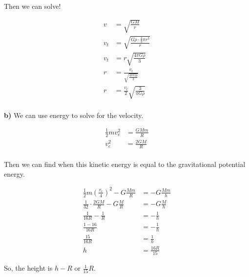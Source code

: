 \documentclass{article}
\begin{document}
Then we can solve!

\begin{align*}
    v &= \sqrt{\frac{GM}{r}} \\
    v_t &= \sqrt{\frac{G\rho\cdot\frac{4}{3}\pi r^3}{r}} \\
    v_t &= r \sqrt{\frac{4\pi G\rho}{3}} \\
    r &= \frac{v_t}{\sqrt{\frac{4\pi G\rho}{3}}} \\
    r &= \frac{v_t}{2}\sqrt{\frac{3}{\pi G\rho}} \\
\end{align*}

\vspace{1cm}
\textbf{b)} We can use energy to solve for the velocity.

\begin{align*}
    \frac{1}{2}mv_e^2 &= \frac{GMm}{R} \\
    v_e^2 &= \frac{2GM}{R} \\
\end{align*}

Then we can find when this kinetic energy is equal to the gravitational potential energy.

\begin{align*}
    \frac{1}{2}m\left(\frac{v_e}{4}\right)^2-G\frac{Mm}{R}&=-G\frac{Mm}{h} \\
    \frac{1}{32}\cdot\frac{2GM}{R}-G\frac{M}{R}&=-G\frac{M}{h} \\
    \frac{1}{16R}-\frac{1}{R}&=-\frac{1}{h} \\
    \frac{1-16}{16R}&=-\frac{1}{h} \\
    \frac{15}{16R}&=\frac{1}{h} \\
    h &= \frac{16R}{15}
\end{align*}

So, the height is $h-R$ or $\frac{1}{15}R$.
\end{document}
